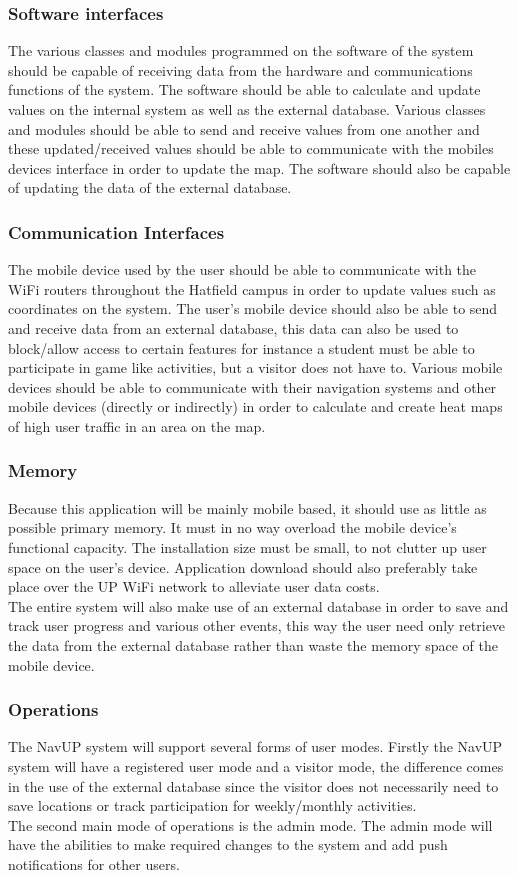 \documentclass[a4paper,12pt]{article}
\begin{document}
\subsubsection{Software interfaces}
The various classes and modules programmed on the software of the system should be capable of receiving data from the hardware and communications functions of the system. The software should be able to calculate and update values on the internal system as well as the external database. Various classes and modules should be able to send and receive values from one another and these updated/received values should be able to communicate with the mobiles devices interface in order to update the map. The software should also be capable of updating the data of the external database.\\
\subsubsection{Communication Interfaces}
The mobile device used by the user should be able to communicate with the WiFi routers throughout the Hatfield campus in order to update values such as coordinates on the system. The user’s mobile device should also be able to send and receive data from an external database, this data can also be used to block/allow access to certain features for instance a student must be able to participate in game like activities, but a visitor does not have to. Various mobile devices should be able to communicate with their navigation systems and other mobile devices (directly or indirectly) in order to calculate and create heat maps of high user traffic in an area on the map.
\subsubsection{Memory}
Because this application will be mainly mobile based, it should use as little as possible primary memory. It must in no way overload the mobile device's functional capacity. The installation size must be small, to not clutter up user space on the user's device. Application download should also preferably take place over the UP WiFi network to alleviate user data costs.\\
The entire system will also make use of an external database in order to save and track user progress and various other events, this way the user need only retrieve the data from the external database rather than waste the memory space of the mobile device.
\subsubsection{Operations}
The NavUP system will support several forms of user modes. Firstly the NavUP system will have a registered user mode and a visitor mode, the difference comes in the use of the external database since the visitor does not necessarily need to save locations or track participation for weekly/monthly activities.\\
The second main mode of operations is the admin mode. The admin mode will have the abilities to make required changes to the system and add push notifications for other users. 
\end{document}

